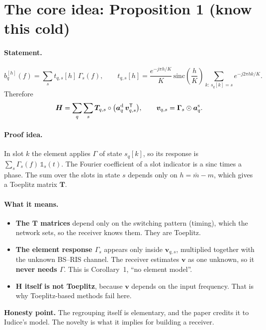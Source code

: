 \documentclass[11pt,a4paper]{article}
\newcommand{\T}{\mathsf T}
\begin{document}
\section{The core idea: Proposition 1 (know this cold)}
\paragraph{Statement.}
\[ b_q^{[h]}(f) = \sum_s t_{q,s}[h]\,\Gamma_s(f), \qquad
t_{q,s}[h] = \frac{e^{-j\pi h/K}}{K}\,\mathrm{sinc}\!\left(\frac hK\right) \sum_{k:\,s_q[k]=s} e^{-j2\pi hk/K}. \]
Therefore
\[ \bm H = \sum_q\sum_s \bm T_{q,s}\circ\big(\bm a^{\rm d}_q\,\bm v_{q,s}^{\T}\big), \qquad
\bm v_{q,s} = \bm\Gamma_s\odot\bm a^{\rm s}_q. \]

\paragraph{Proof idea.} In slot $k$ the element applies $\Gamma$ of state $s_q[k]$, so its response is
$\sum_s\Gamma_s(f)\,\mathbb 1_s(t)$. The Fourier coefficient of a slot indicator is a sinc times a phase. The sum over the
slots in state $s$ depends only on $h=\bar m-m$, which gives a Toeplitz matrix $\bm T$.

\paragraph{What it means.}
\begin{itemize}
\item \textbf{The $\bm T$ matrices} depend only on the switching pattern (timing), which the network sets, so the receiver
knows them. They are Toeplitz.
\item \textbf{The element response $\Gamma_s$} appears only inside $\bm v_{q,s}$, multiplied together with the unknown
BS--RIS channel. The receiver estimates $\bm v$ as one unknown, so it \textbf{never needs $\Gamma$}. This is Corollary~1,
``no element model''.
\item \textbf{$\bm H$ itself is not Toeplitz}, because $\bm v$ depends on the input frequency. That is why Toeplitz-based
methods fail here.
\end{itemize}
\begin{warnbox}
\textbf{Honesty point.} The regrouping itself is elementary, and the paper credits it to Iudice's model. The novelty is
what it implies for building a receiver.
\end{warnbox}
\end{document}
